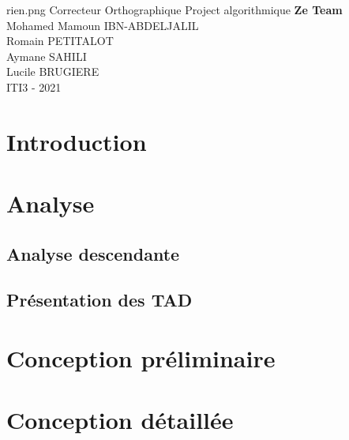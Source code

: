 \documentclass[11pt,a4paper]{article}
\begin{document}
    \PageDeGarde	
    {rien.png} 
    {Correcteur Orthographique} 
    {Project algorithmique} 
    {\textbf{Ze Team} \\
    Mohamed Mamoun \textsc{IBN-ABDELJALIL}\\
    Romain \textsc{PETITALOT}\\
    Aymane \textsc{SAHILI}\\
    Lucile \textsc{BRUGIERE}\\} 
    {ITI3 - 2021}
    
    
    \tableofcontents
    
    \clearpage
    \section*{Introduction}
        
     \clearpage 
     
    \section{Analyse}
        \subsection{Analyse descendante}
        
        \subsection{Présentation des TAD}
    
                
                
                
                \clearpage

    \section{Conception préliminaire}
        
        \clearpage

        
        \clearpage

        
        \clearpage

        
        \clearpage

    \section{Conception détaillée}
        \clearpage
        
\end{document}
